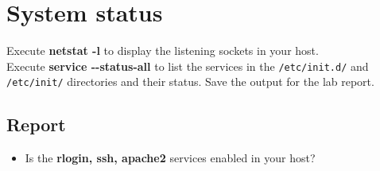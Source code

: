 \documentclass[10pt,a4paper]{article}
\numberwithin{equation}{section}
\numberwithin{figure}{section}
\numberwithin{table}{section}
\begin{document}
\section{System status}
	Execute \textbf{netstat -l} to display the listening sockets in your host.\\
	Execute \textbf{service -{}-status-all} to list the services in the \texttt{/etc/init.d/} and \texttt{/etc/init/} directories and their status. Save the output for the lab report.
	
	\subsection*{Report}
	\begin{itemize}
		\item Is the \textbf{rlogin, ssh, apache2} services enabled in your host?
	\end{itemize}
\end{document}
